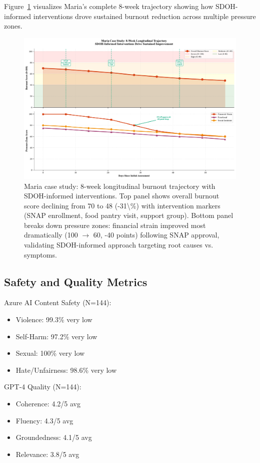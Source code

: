 \documentclass{article}%
\begin{document}
Figure~\ref{fig:longitudinal} visualizes Maria's complete 8-week trajectory showing how SDOH-informed interventions drove sustained burnout reduction across multiple pressure zones.

%
\begin{figure}[htbp]%
\centering%
\includegraphics[width=\textwidth]{fig12_longitudinal_trajectory.pdf}%
\caption{Maria case study: 8-week longitudinal burnout trajectory with SDOH-informed interventions. Top panel shows overall burnout score declining from 70 to 48 (-31\textbackslash{}\%) with intervention markers (SNAP enrollment, food pantry visit, support group). Bottom panel breaks down pressure zones: financial strain improved most dramatically (100 $\rightarrow$ 60, -40 points) following SNAP approval, validating SDOH-informed approach targeting root causes vs. symptoms.}%
\label{fig:longitudinal}%
\end{figure}%
\subsection{Safety and Quality Metrics}%
\label{subsec:SafetyandQualityMetrics}%
Azure AI Content Safety (N=144):
\begin{itemize}
    \item Violence: 99.3\% very low
    \item Self-Harm: 97.2\% very low
    \item Sexual: 100\% very low
    \item Hate/Unfairness: 98.6\% very low
\end{itemize}

GPT-4 Quality (N=144):
\begin{itemize}
    \item Coherence: 4.2/5 avg
    \item Fluency: 4.3/5 avg
    \item Groundedness: 4.1/5 avg
    \item Relevance: 3.8/5 avg
\end{itemize}
\end{document}
